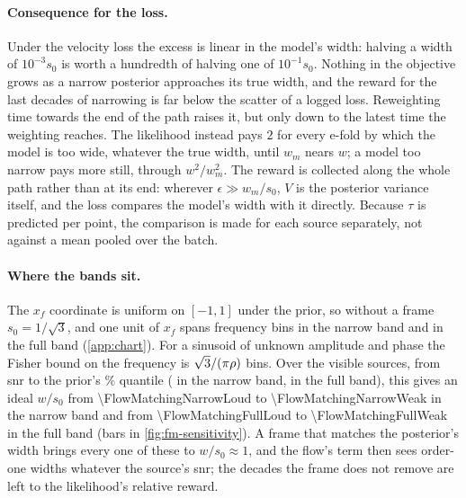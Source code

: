 \paragraph{Consequence for the loss.}
Under the velocity loss the excess is linear in the model's width: halving a width of
$10^{-3}s_0$ is worth a hundredth of halving one of $10^{-1}s_0$. Nothing in the objective grows as
a narrow posterior approaches its true width, and the reward for the last decades of narrowing is
far below the scatter of a logged loss. Reweighting time towards the end of the path raises it, but
only down to the latest time the weighting reaches. The likelihood instead pays $2$ for every e-fold
by which the model is too wide, whatever the true width, until $w_m$ nears $w$; a model too narrow
pays more still, through $w^2/w_m^2$. The reward is collected along the whole path rather than at
its end: wherever $\epsilon\gg w_m/s_0$, $V$ is the posterior variance itself, and the loss compares
the model's width with it directly. Because $\tau$ is predicted per point, the comparison is made
for each source separately, not against a mean pooled over the batch.

\paragraph{Where the bands sit.}
The $x_f$ coordinate is uniform on $[-1,1]$ under the prior, so without a frame $s_0 = 1/\sqrt3$,
and one unit of $x_f$ spans \FlowMatchingNarrowBinsPerUnit{} frequency bins in the narrow band and
\FlowMatchingFullBinsPerUnit{} in the full band (\cref{app:chart}). For a sinusoid of unknown
amplitude and phase the Fisher bound on the frequency is $\sqrt3/(\pi\rho)$ bins. Over the visible
sources, from \ac{snr} \FlowMatchingSnrLow{} to the prior's \FlowMatchingSnrQuantile{}\% quantile
(\FlowMatchingNarrowSnrHigh{} in the narrow band, \FlowMatchingFullSnrHigh{} in the full band),
this gives an ideal $w/s_0$ from \num{\FlowMatchingNarrowLoud} to \num{\FlowMatchingNarrowWeak} in
the narrow band and from \num{\FlowMatchingFullLoud} to \num{\FlowMatchingFullWeak} in the full band
(bars in \cref{fig:fm-sensitivity}). A frame that matches the posterior's width brings every one of
these to $w/s_0\approx1$, and the flow's term then sees order-one widths whatever the source's
\ac{snr}; the decades the frame does not remove are left to the likelihood's relative reward.

